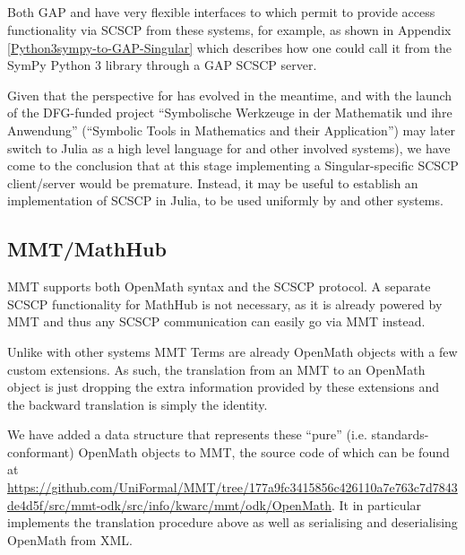 \documentclass{deliverablereport}
\begin{document}
\subsection{\Singular}

Both GAP and \Sage have very flexible interfaces to \Singular
which permit to provide access \Singular functionality via SCSCP
from these systems, for example, as shown in 
Appendix \ref{Python3sympy-to-GAP-Singular} which 
describes how one could call it from the SymPy Python 3 library 
through a GAP SCSCP server.


Given that the perspective for \Singular has evolved in the meantime,
and with the launch of the DFG-funded project 
``Symbolische Werkzeuge in der Mathematik und ihre Anwendung''
(``Symbolic Tools in Mathematics and their Application'')
\Singular may later switch to Julia as a high level language 
for \Singular and other involved systems), we have come to the
conclusion that at this stage implementing a Singular-specific
SCSCP client/server would be premature. Instead, it may be useful
to establish an implementation of SCSCP in Julia, to be used 
uniformly by \Singular and other systems.


\subsection{MMT/MathHub}

MMT supports both OpenMath syntax and the SCSCP protocol. A separate SCSCP
functionality for MathHub is not necessary, as it is already powered by MMT and
thus any SCSCP communication can easily go via MMT instead.

Unlike with other systems MMT Terms are already OpenMath objects with a few
custom extensions. As such, the translation from an MMT to an OpenMath object
is just dropping the extra information provided by these extensions and the
backward translation is simply the identity.

We have added a data structure that represents these ``pure''
(i.e. standards-conformant) OpenMath objects to MMT, the source code of
which can be found at
\url{https://github.com/UniFormal/MMT/tree/177a9fc3415856c426110a7e763c7d7843de4d5f/src/mmt-odk/src/info/kwarc/mmt/odk/OpenMath}.
It in particular implements the translation procedure above as well as
serialising and deserialising OpenMath from XML.
\end{document}
